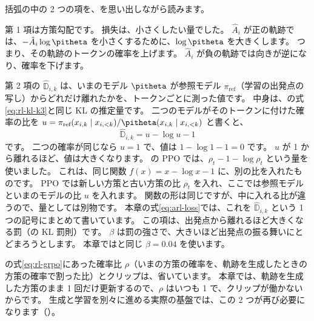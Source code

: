 括弧の中の 2 つの項を、を思い出しながら読みます。

第 1 項は方策勾配です。
損失は、小さくしたい量でした。
$\hat A_i$ が正の軌跡では、$-\hat A_i\log\pitheta$ を小さくするために、$\log\pitheta$ を大きくします。
つまり、その軌跡のトークンの確率を上げます。
$\hat A_i$ が負の軌跡では向きが逆になり、確率を下げます。

第 2 項の $\hat{\mathbb{D}}_{i,k}$ は、いまのモデル $\pitheta$ が参照モデル $\pi_{\text{ref}}$（学習の出発点の写し）からどれだけ離れたかを、トークンごとに測った値です。
中身は、の式\eqref{eq:rl-kl-k3}と同じ KL の推定量です。
二つのモデルがそのトークンに付けた確率の比を $u=\pi_{\text{ref}}(x_{i,k}\mid x_{i,<k})/\pitheta(x_{i,k}\mid x_{i,<k})$ と書くと、
\begin{equation*}
\hat{\mathbb{D}}_{i,k}=u-\log u-1
\end{equation*}
です。
二つの確率が同じなら $u=1$ で、値は $1-\log1-1=0$ です。
$u$ が 1 から離れるほど、値は大きくなります。
の PPO では、$\rho_t-1-\log\rho_t$ という量を使いました。
これは、同じ関数 $f(x)=x-\log x-1$ に、別の比を入れたものです。
PPO では新しい方策と古い方策の比 $\rho_t$ を入れ、ここでは参照モデルといまのモデルの比 $u$ を入れます。
関数の形は同じですが、中に入れる比が違うので、量としては別物です。
本章の式\eqref{eq:arl-loss}では、これを $\hat{\mathbb{D}}_{i,k}$ という 1 つの記号にまとめて書いています。
この項は、出発点から離れるほど大きくなる罰（の KL 罰則）です。
$\beta$ は罰の強さで、大きいほど出発点の振る舞いにとどまろうとします。
本章ではと同じ $\beta=0.04$ を使います。

の式\eqref{eq:rl-grpo}にあった確率比 $\rho$（いまの方策の確率を、軌跡を生成したときの方策の確率で割った比）とクリップは、省いています。
本章では、軌跡を生成した方策のまま 1 回だけ更新するので、$\rho$ はいつも 1 で、クリップが働かないからです。
生成と学習を別々に進める実際の基盤では、この 2 つが再び必要になります（）。

